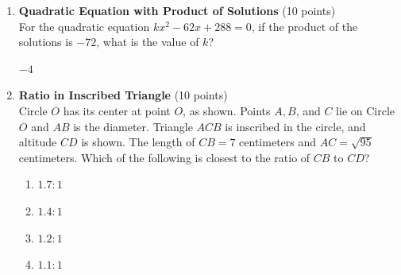 \begin{enumerate}
  \newpage
  \item \textbf{Quadratic Equation with Product of Solutions} (10 points)\\
  For the quadratic equation $kx^2 - 62x + 288 = 0$, if the product of the solutions is $-72$, what is the value of $k$?
  \begin{subanswer}
    $-4$
  \end{subanswer}

  \item \textbf{Ratio in Inscribed Triangle} (10 points)\\
  Circle $O$ has its center at point $O$, as shown. Points $A, B$, and $C$ lie on Circle $O$ and $AB$ is the diameter. Triangle $ACB$ is inscribed in the circle, and altitude $CD$ is shown. The length of $CB=7$ centimeters and $AC=\sqrt{95}$ centimeters. Which of the following is closest to the ratio of $CB$ to $CD$?
  \begin{enumerate}[label=(\Alph*)]
    \item $1.7:1$
    \item $1.4:1$
    \item $1.2:1$
    \item $1.1:1$
  \end{enumerate}
  \begin{subanswer}
  \end{subanswer}



\end{enumerate}

